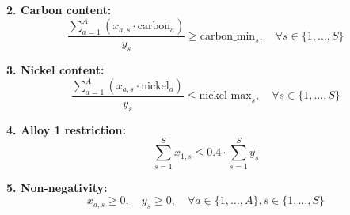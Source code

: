 \documentclass{article}
\begin{document}
\textbf{2. Carbon content:}
\[
\frac{\sum_{a=1}^{A} (x_{a,s} \cdot \text{carbon}_{a})}{y_s} \geq \text{carbon\_min}_{s}, \quad \forall s \in \{1, \ldots, S\}
\]

\textbf{3. Nickel content:}
\[
\frac{\sum_{a=1}^{A} (x_{a,s} \cdot \text{nickel}_{a})}{y_s} \leq \text{nickel\_max}_{s}, \quad \forall s \in \{1, \ldots, S\}
\]

\textbf{4. Alloy 1 restriction:}
\[
\sum_{s=1}^{S} x_{1,s} \leq 0.4 \cdot \sum_{s=1}^{S} y_s
\]

\textbf{5. Non-negativity:}
\[
x_{a,s} \geq 0, \quad y_s \geq 0, \quad \forall a \in \{1, \ldots, A\}, s \in \{1, \ldots, S\}
\]
\end{document}
